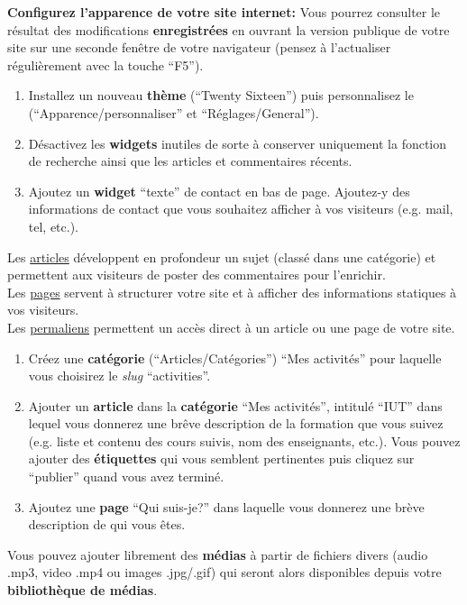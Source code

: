 \documentclass[a4paper, 8pt]{article}
\begin{document}
\exost \textbf{Configurez l'apparence de votre site internet:} Vous pourrez consulter le r\'esultat des modifications \textbf{enregistr\'ees} en ouvrant la version publique de votre site
sur une seconde fen\^etre de votre navigateur (pensez \`a l'actualiser r\'eguli\`erement avec la touche ``F5'').
\begin{enumerate}
 \item Installez un nouveau \textbf{th\`eme} (``Twenty Sixteen'') puis personnalisez le (``Apparence/personnaliser'' et ``R\'eglages/General'').
 \item D\'esactivez les \textbf{widgets} inutiles de sorte \`a conserver uniquement la fonction de recherche ainsi que les articles et commentaires r\'ecents. 
 \item Ajoutez un \textbf{widget} ``texte'' de contact en bas de page. Ajoutez-y des informations de contact que vous souhaitez afficher \`a vos visiteurs (e.g. mail, tel, etc.).
\end{enumerate}

\exost Les \underline{articles} d\'eveloppent en profondeur un sujet (class\'e dans une cat\'egorie) et permettent aux visiteurs de poster des commentaires pour l'enrichir.\\
Les \underline{pages} servent \`a structurer votre site et \`a afficher des informations statiques \`a vos visiteurs.\\
Les \underline{permaliens} permettent un acc\`es direct \`a un article ou une page de votre site.
%
\begin{enumerate}
 \item Cr\'eez une \textbf{cat\'egorie} (``Articles/Cat\'egories'') ``Mes activit\'es'' pour laquelle vous choisirez le \textit{slug} ``activities''.
 \item Ajouter un \textbf{article} dans la \textbf{cat\'egorie} ``Mes activit\'es'', intitul\'e ``IUT'' dans lequel vous donnerez une br\^eve description de la formation que vous suivez (e.g. liste et contenu des cours suivis, nom des enseignants, etc.). 
 Vous pouvez ajouter des \textbf{\'etiquettes} qui vous semblent pertinentes puis cliquez sur ``publier'' quand vous avez termin\'e.
 \item Ajoutez une \textbf{page} ``Qui suis-je?'' dans laquelle vous donnerez une br\`eve description de qui vous \^etes.
\end{enumerate}
Vous pouvez ajouter librement des \textbf{m\'edias} \`a partir de fichiers divers (audio .mp3, video .mp4 ou images .jpg/.gif) qui seront alors disponibles depuis votre \textbf{biblioth\`eque de m\'edias}.
\end{document}
